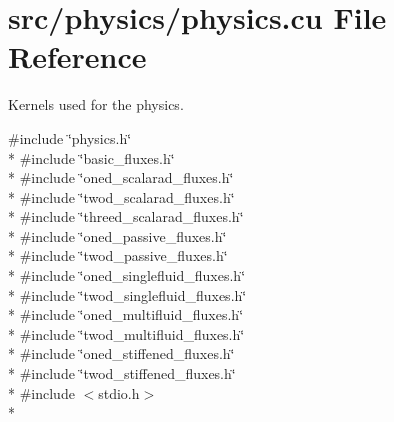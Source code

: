 \section{src/physics/physics.cu File Reference}
\label{physics_8cu}


Kernels used for the physics.  


{\ttfamily \#include \char`\"{}physics.\-h\char`\"{}}\\*
{\ttfamily \#include \char`\"{}basic\-\_\-fluxes.\-h\char`\"{}}\\*
{\ttfamily \#include \char`\"{}oned\-\_\-scalarad\-\_\-fluxes.\-h\char`\"{}}\\*
{\ttfamily \#include \char`\"{}twod\-\_\-scalarad\-\_\-fluxes.\-h\char`\"{}}\\*
{\ttfamily \#include \char`\"{}threed\-\_\-scalarad\-\_\-fluxes.\-h\char`\"{}}\\*
{\ttfamily \#include \char`\"{}oned\-\_\-passive\-\_\-fluxes.\-h\char`\"{}}\\*
{\ttfamily \#include \char`\"{}twod\-\_\-passive\-\_\-fluxes.\-h\char`\"{}}\\*
{\ttfamily \#include \char`\"{}oned\-\_\-singlefluid\-\_\-fluxes.\-h\char`\"{}}\\*
{\ttfamily \#include \char`\"{}twod\-\_\-singlefluid\-\_\-fluxes.\-h\char`\"{}}\\*
{\ttfamily \#include \char`\"{}oned\-\_\-multifluid\-\_\-fluxes.\-h\char`\"{}}\\*
{\ttfamily \#include \char`\"{}twod\-\_\-multifluid\-\_\-fluxes.\-h\char`\"{}}\\*
{\ttfamily \#include \char`\"{}oned\-\_\-stiffened\-\_\-fluxes.\-h\char`\"{}}\\*
{\ttfamily \#include \char`\"{}twod\-\_\-stiffened\-\_\-fluxes.\-h\char`\"{}}\\*
{\ttfamily \#include $<$stdio.\-h$>$}\\*
